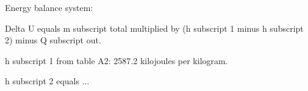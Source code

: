 Energy balance system:  

Delta U equals m subscript total multiplied by (h subscript 1 minus h subscript 2) minus Q subscript out.  

h subscript 1 from table A2: 2587.2 kilojoules per kilogram.  

h subscript 2 equals ...